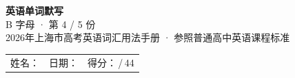 \documentclass[10pt,a4paper]{article}
\begin{document}
\pagestyle{plain}

\begin{center}
{\LARGE\bfseries 英语单词默写}\\[0.22em]
{\large B 字母 · 第 4 / 5 份}\\[0.18em]
{\small 2026年上海市高考英语词汇用法手册 · 参照普通高中英语课程标准}
\end{center}

\vspace{0.25em}
\noindent\begin{tabular}{@{}p{}@{}p{}@{}p{}@{}}
姓名：\underline{\hspace{2.0cm}} & 日期：\underline{\hspace{2.0cm}} & 得分：\underline{\hspace{1.3cm}}\,/\,44 \\
\end{tabular}

\vspace{0.3em}

\vspace{0.08em}
\end{document}
